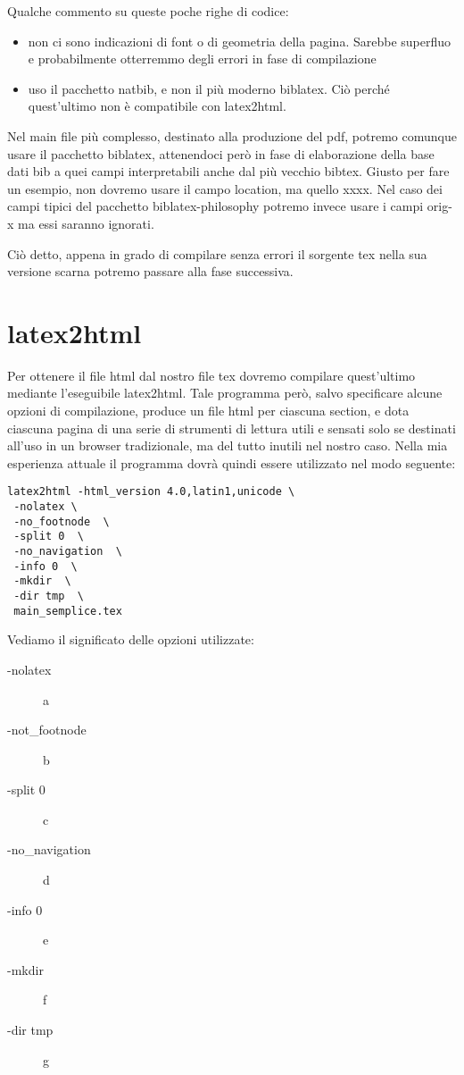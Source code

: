 Qualche commento su queste poche righe di codice:
\begin{itemize}
\item
non ci sono indicazioni di font o di geometria della pagina. Sarebbe
superfluo e probabilmente otterremmo degli errori in fase di compilazione

\item
uso il pacchetto natbib, e non il più moderno biblatex. Ciò
perché quest'ultimo non è compatibile con latex2html.
\end{itemize}

Nel main file più complesso, destinato alla produzione del pdf, potremo
comunque usare  il pacchetto biblatex, attenendoci però in fase di
elaborazione della base dati bib a quei campi interpretabili anche dal più
vecchio bibtex. Giusto per fare un esempio, non dovremo usare il campo location,
ma quello xxxx. Nel caso dei campi tipici del pacchetto biblatex-philosophy
potremo invece usare i campi orig-x ma essi saranno ignorati.

Ciò detto, appena in grado di compilare senza errori il sorgente tex nella sua
versione  scarna potremo passare alla fase successiva.

\section{latex2html}

Per ottenere il file html dal nostro file tex dovremo compilare quest'ultimo 
mediante l'eseguibile latex2html. Tale programma però, salvo specificare alcune
opzioni di compilazione, produce un file html per ciascuna section, e dota 
ciascuna pagina di una serie di strumenti di lettura utili e sensati solo se 
destinati all'uso in un browser tradizionale, ma del tutto inutili nel nostro 
caso. Nella mia esperienza attuale il programma dovrà quindi essere utilizzato 
nel modo seguente:


\begin{lstlisting}
latex2html -html_version 4.0,latin1,unicode \
 -nolatex \
 -no_footnode  \
 -split 0  \
 -no_navigation  \
 -info 0  \
 -mkdir  \
 -dir tmp  \
 main_semplice.tex
\end{lstlisting}

Vediamo il significato delle opzioni utilizzate:

\begin{description}
\item[-nolatex] a

\item[-not\_footnode] b

\item[-split 0] c

\item[-no\_navigation] d

\item[-info 0] e

\item[-mkdir] f

\item[-dir tmp] g

\end{description}


